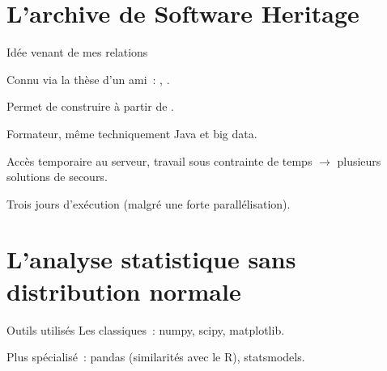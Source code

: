\documentclass[usenames,dvipsnames,10pt]{beamer}
\begin{document}
\section{L'archive de Software Heritage}

\begin{frame}[fragile]{Idée venant de mes relations}
    \begin{figure}
        
    \end{figure}

    Connu via la thèse d'un ami : \emph{},
    \textcite{swh-seirl}.

    Permet de construire à partir de \textcite{signals-2019}.

\end{frame}

\begin{frame}{Formateur, même techniquement}
    Java et big data.

    Accès temporaire au serveur, travail sous contrainte de temps $\rightarrow$
    plusieurs solutions de secours.

    Trois jours d'exécution (malgré une forte parallélisation).
\end{frame}

\section{L'analyse statistique sans distribution normale}

\begin{frame}{Outils utilisés}
    Les classiques : numpy, scipy, matplotlib.

    Plus spécialisé : pandas (similarités avec le R), statsmodels.

\end{frame}
\end{document}
